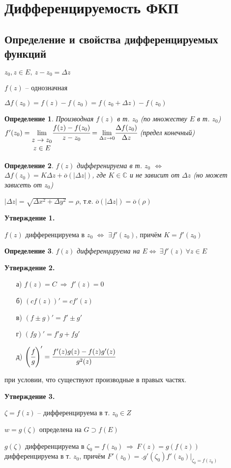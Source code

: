\documentclass[draft]{report}
\newcommand{\then}{\ \Rightarrow\ }
\renewcommand{\C}{\mathbb{C}}
\newcommand{\mlim}[1]{\underset{#1}{\lim}}
\newcommand{\LRA}{\Leftrightarrow}
\renewcommand{\bar}{\overline}
\newcommand{\D}{\Delta}
\renewcommand{\o}{\bar{o}}
\newcommand{\mat}[1]{\begin{matrix}#1\end{matrix}}
\newcommand{\opr}[1]{\begin{opred}#1\end{opred}}
\newtheorem*{opred}{Определение}
\theoremstyle{remark}
\begin{document}
\section{Дифференцируемость ФКП}

\subsection{Определение и свойства дифференцируемых функций}

$z_0,z\in E,\ z-z_0=\Delta z$

$f(z)$ -- однозначная

$\Delta f(z_0)=f(z)-f(z_0)=f(z_0+\Delta z)-f(z_0)$

\opr{Производная $f(z)$ в т. $z_0$ (по множеству $E$ в т. $z_0$) $f'(z_0)=\mlim{\mat{z\to z_0 \\ z\in E}}\cfrac{f(z)-f(z_0)}{z-z_0}=\mlim{\D z\to 0}\cfrac{\D f(z_0)}{\D z}$ (предел конечный)}

\opr{$f(z)$ дифференируема в т. $z_0$ $\LRA$ $\D f(z_0)=K\D z+\o(|\D z|)$, где $K\in\C$ и не зависит от $\D z$ (но может зависеть от $z_0$)}

$|\D z|=\sqrt{\D x^2+\D y^2}=\rho$, т.е. $\overline{o}(|\D z|)=\overline{o}(\rho)$

{\bfseries Утверждение 1.}

$f(z)$ дифференцируема в $z_0$ $\LRA$ $\exists f'(z_0)$, причём $K=f'(z_0)$

\opr{$f(z)$ дифференцируема на $E\LRA\ \exists f'(z)\ \forall z\in E$ }

{\bfseries Утверждение 2.}
\begin{itemize}
\item[а)] $f(z)=C\then f'(z)=0$
\item[б)] $(cf(z))'=cf'(z)$
\item[в)] $(f\pm g)'=f'\pm g'$
\item[г)] $(fg)'=f'g+fg'$
\item[д)] $\left(\cfrac fg\right)'=\cfrac{f'(z)g(z)-f(z)g'(z)}{g^2(z)}$
\end{itemize} при условии, что существуют производные в правых частях.

{\bfseries Утверждение 3.}

$\zeta=f(z)$ -- дифференцируема в т. $z_0\in Z$

$w=g(\zeta)$ определена на $G\supset f(E)$

$g(\zeta)$ дифференцируема в $\zeta_0=f(z_0)\then F(z)=g(f(z))$ дифференцируема в т. $z_0$, причём $F'(z_0)=\bigl.g'(\zeta_0)f'(z_0)\bigr|_{\zeta_0=f(z_0)}$
\end{document}
